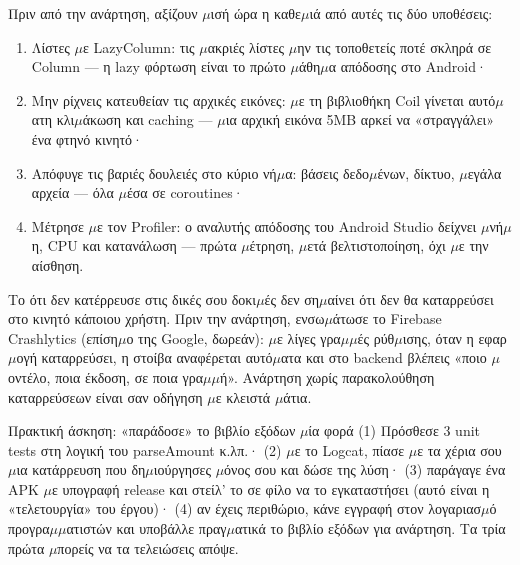 Πριν από την ανάρτηση, αξίζουν $\mu$ισή ώρα η καθε$\mu$ιά από αυτές τις δύο υποθέσεις:


\begin{enumerate}
  \item Λίστες $\mu$ε LazyColumn: τις $\mu$ακριές λίστες $\mu$ην τις τοποθετείς ποτέ σκληρά σε Column — η lazy φόρτωση είναι το πρώτο $\mu$άθη$\mu$α απόδοσης στο Android·
  \item Μην ρίχνεις κατευθείαν τις αρχικές εικόνες: $\mu$ε τη βιβλιοθήκη Coil γίνεται αυτό$\mu$ατη κλι$\mu$άκωση και caching — $\mu$ια αρχική εικόνα 5MB αρκεί να «στραγγάλει» ένα φτηνό κινητό·
  \item Απόφυγε τις βαριές δουλειές στο κύριο νή$\mu$α: βάσεις δεδο$\mu$ένων, δίκτυο, $\mu$εγάλα αρχεία — όλα $\mu$έσα σε coroutines·
  \item Μέτρησε $\mu$ε τον Profiler: ο αναλυτής απόδοσης του Android Studio δείχνει $\mu$νή$\mu$η, CPU και κατανάλωση — πρώτα $\mu$έτρηση, $\mu$ετά βελτιστοποίηση, όχι $\mu$ε την αίσθηση.
\end{enumerate}


Το ότι δεν κατέρρευσε στις δικές σου δοκι$\mu$ές δεν ση$\mu$αίνει ότι δεν θα καταρρεύσει στο κινητό κάποιου χρήστη. Πριν την ανάρτηση, ενσω$\mu$άτωσε το Firebase Crashlytics (επίση$\mu$ο της Google, δωρεάν): $\mu$ε λίγες γρα$\mu$$\mu$ές ρύθ$\mu$ισης, όταν η εφαρ$\mu$ογή καταρρεύσει, η στοίβα αναφέρεται αυτό$\mu$ατα και στο backend βλέπεις «ποιο $\mu$οντέλο, ποια έκδοση, σε ποια γρα$\mu$$\mu$ή». Ανάρτηση χωρίς παρακολούθηση καταρρεύσεων είναι σαν οδήγηση $\mu$ε κλειστά $\mu$άτια.

\begin{tcbpractice}{Πρακτική άσκηση: «παράδοσε» το βιβλίο εξόδων $\mu$ία φορά}
(1) Πρόσθεσε 3 unit tests στη λογική του parseAmount κ.λπ.· (2) $\mu$ε το Logcat, πίασε $\mu$ε τα χέρια σου $\mu$ια κατάρρευση που δη$\mu$ιούργησες $\mu$όνος σου και δώσε της λύση· (3) παράγαγε ένα APK $\mu$ε υπογραφή release και στείλ’ το σε φίλο να το εγκαταστήσει (αυτό είναι η «τελετουργία» του έργου)· (4) αν έχεις περιθώριο, κάνε εγγραφή στον λογαριασ$\mu$ό προγρα$\mu$$\mu$ατιστών και υποβάλλε πραγ$\mu$ατικά το βιβλίο εξόδων για ανάρτηση. Τα τρία πρώτα $\mu$πορείς να τα τελειώσεις απόψε.

\end{tcbpractice}

